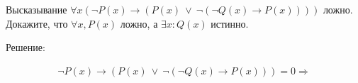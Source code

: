 \documentclass[a4paper, fontsize=10pt]{article}
\begin{document}
    \section{}
    Высказывание $\forall x(\lnot P(x) \rightarrow (P(x) \ \vee \ \lnot(\lnot Q(x) \rightarrow P(x))))$ ложно. Докажите, что 
    $\forall x, P(x)$ ложно, а $\exists x : Q(x)$ истинно.

    Решение:

    \begin{align*}
        \lnot P(x) \rightarrow (P(x) \ \vee \ \lnot(\lnot Q(x) \rightarrow P(x))) = 0 \Longrightarrow 
    \end{align*}
    
    

    
\end{document}
